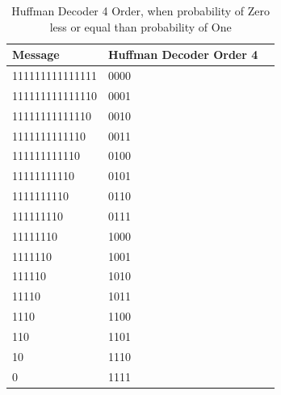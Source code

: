 \begin{refsection}
\begin{table}[H]
\centering
\caption{Huffman Decoder 4 Order, when probability of Zero less or equal than probability of One}
\label{tb:hufmmandecoder6}
\begin{tabular}{|l|l|l|}
\hline
\textbf{Message}                      & \textbf{Huffman Decoder Order 4}                                       \\ \hline
111111111111111         & 0000                                                \\ \hline
111111111111110         & 0001                                      \\ \hline
11111111111110           & 0010                                  \\ \hline
1111111111110             & 0011                          \\ \hline
111111111110               & 0100                                           \\ \hline
11111111110                 & 0101                                          \\ \hline
1111111110                   & 0110                                      \\ \hline
111111110                     & 0111                                    \\ \hline
11111110                       & 1000                                   \\ \hline
1111110                         & 1001                                 \\ \hline
111110                           & 1010                              \\ \hline
11110                             & 1011                      \\ \hline
1110                               & 1100                           \\ \hline
110                                 & 1101                         \\ \hline
10                                   & 1110                      \\ \hline
 0                                    & 1111                     \\ \hline
\end{tabular}
\end{table}



\end{refsection}
